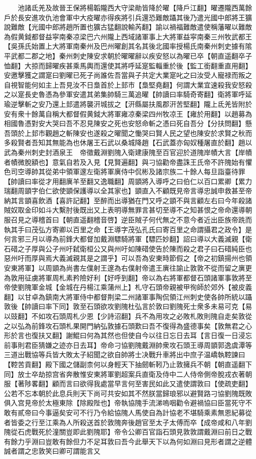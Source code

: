 　　池諸氐羌及故晉王保將楊韜隴西大守梁勛皆降於曜【降戶江翻】曜遷隴西萬餘戶於長安進攻仇池會軍中大疫曜亦得疾將引兵還恐難敵躡其後乃遣光國中郎將王獷說難敵【光國中郎將趙所置也獷古猛翻說輸芮翻】諭以禍福難敵遣使稱藩曜以難敵為假黄鉞都督益寜南秦凉梁巴六州隴上西域諸軍事上大將軍益寜南秦三州牧武都王【吳孫氏始置上大將軍南秦州及巴州曜創其名其後北國率授楊氏南秦州刺史據有隂平武都二郡之地】秦州刺史陳安求朝於曜曜辭以疾安怒以為曜已卒【朝直遥翻卒子恤翻】大掠而歸曜疾甚乘馬輿而還使其將呼延寔監輜重於後【監工銜翻重直用翻】安邀擊獲之謂寔曰劉曜已死子尚誰佐吾當與子共定大業寔叱之曰汝受人寵禄而叛之自視智能何如主上吾見汝不日梟首於上邽市【梟堅堯翻】何謂大業宜速殺我安怒殺之以寔長史魯憑為參軍安遣其弟集帥騎三萬追曜【帥讀曰率騎奇寄翻】衛將軍呼延瑜逆擊斬之安乃還上邽遣將襲汧城拔之【汧縣屬扶風郡汧苦堅翻】隴上氐羌皆附於安有衆十餘萬自稱大都督假黄鉞大將軍雍凉秦梁四州牧凉王【雍於用翻】以趙募為相國魯憑對安大哭曰吾不忍見陳安之死也安怒命斬之憑曰死自吾分【分扶問翻】懸吾頭於上邽市觀趙之斬陳安也遂殺之曜聞之慟哭曰賢人民之望也陳安於求賢之秋而多殺賢者吾知其無能為也休屠王石武以桑城降趙【石武蓋亦匈奴種屠直於翻】趙以武為秦州刺史封酒泉王　帝徵戴淵劉隗入衛建康隗至百官迎於道隗岸幘大言【岸幘者幘微脫額也】意氣自若及入見【見賢遍翻】與刁協勸帝盡誅王氏帝不許隗始有懼色司空導帥其從弟中領軍邃左衛將軍廙侍中侃彬及諸宗族二十餘人每旦詣臺待罪【帥讀曰率從才用翻廙羊至翻又逸職翻】周顗將入導呼之曰伯仁以百口累卿【累力瑞翻周顗字伯仁欲使顗保護導以全其家也】顗直入不顧既見帝言導忠誠申救甚至帝納其言顗喜飲酒【喜許記翻】至醉而出導猶在門又呼之顗不與言顧左右曰今年殺諸賊奴取金印如斗大繫肘後既出又上表明導無罪言甚切至導不之知甚恨之帝命還導朝服召見之導稽首曰【朝直遥翻稽音啓】逆臣賊子何代無之不意今者近出臣族帝跣而執其手曰茂弘方寄卿以百里之命【王導字茂弘孔氏曰寄百里之命謂攝君之政令】是何言邪三月以導為前鋒大都督加戴淵驃騎將軍【驃匹妙翻】詔曰導以大義滅親【衛石碏之子厚與公子州吁弑衛桓公又與州吁如陳碏使告於陳而殺之君子曰石碏純臣也惡州吁而厚與焉大義滅親其是之謂乎】可以吾為安東時節假之【帝之初鎮揚州也領安東將軍】以周顗為尚書左僕射王邃為右僕射帝遣王廙往諭止敦敦不從而留之廙更為敦用征虜將軍周札素矜險好利【好呼到翻】帝以為右將軍都督石頭諸軍事敦將至帝使劉隗軍金城【金城在丹楊江乘蒲州上】札守石頭帝親被甲徇師於郊外【被皮義翻】以甘卓為鎮南大將軍侍中都督荆梁二州諸軍事陶侃領江州刺史使各帥所統以躡敦後【帥讀曰率下同】敦至石頭欲攻劉隗杜弘言於敦曰劉隗死士衆多未易可克【易以豉翻】不如攻石頭周札少恩【少詩沼翻】兵不為用攻之必敗札敗則隗自走矣敦從之以弘為前鋒攻石頭札果開門納弘敦據石頭歎曰吾不復得為盛德事矣【敦無君之心形於言也復扶又翻】謝鯤曰何為其然也但使自今以往日忘日去耳【言日復一日浸忘前事則君臣猜嫌之迹亦日去耳】帝命刁協劉隗戴淵帥衆攻石頭王導周顗郭逸虞潭等三道出戰協等兵皆大敗太子紹聞之欲自帥將士决戰升車將出中庶子温嶠執鞚諫曰【鞚苦貢翻】殿下國之儲副柰何以身輕天下抽劒斬靷乃止敦擁兵不朝【朝直遥翻下同】放士卒劫掠宫省奔散惟安東將軍劉超案兵直衛及侍中二人侍帝側帝脫戎衣著朝服【著陟畧翻】顧而言曰欲得我處當早言何至害民如此又遣使謂敦曰【使疏吏翻】公若不忘本朝於此息兵則天下尚可共安如其不然朕當歸琅邪以避賢路刁協劉隗既敗俱入宫見帝於太極東除【除殿陛也】帝執協隗手流涕嗚咽勸令避禍協曰臣當死守不敢有貳帝曰今事逼矣安可不行乃令給協隗人馬使自為計協老不堪騎乘素無恩紀募從者皆委之行至江乘為人所殺送首於敦隗奔後趙官至太子太傅而卒【成帝咸和八年劉隗從石虎戰死於潼關豈即此劉隗耶】帝令公卿百官詣石頭見敦敦謂戴淵曰前日之戰有餘力乎淵曰豈敢有餘但力不足耳敦曰吾今此舉天下以為何如淵曰見形者謂之逆體誠者謂之忠敦笑曰卿可謂能言又
